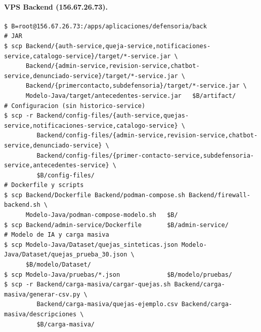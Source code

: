 \paragraph{VPS Backend (156.67.26.73).}
\begin{lstlisting}
$ B=root@156.67.26.73:/apps/aplicaciones/defensoria/back
# JAR
$ scp Backend/{auth-service,queja-service,notificaciones-service,catalogo-service}/target/*-service.jar \
      Backend/{admin-service,revision-service,chatbot-service,denunciado-service}/target/*-service.jar \
      Backend/{primercontacto,subdefensoria}/target/*-service.jar \
      Modelo-Java/target/antecedentes-service.jar   $B/artifact/
# Configuracion (sin historico-service)
$ scp -r Backend/config-files/{auth-service,quejas-service,notificaciones-service,catalogo-service} \
         Backend/config-files/{admin-service,revision-service,chatbot-service,denunciado-service} \
         Backend/config-files/{primer-contacto-service,subdefensoria-service,antecedentes-service} \
         $B/config-files/
# Dockerfile y scripts
$ scp Backend/Dockerfile Backend/podman-compose.sh Backend/firewall-backend.sh \
      Modelo-Java/podman-compose-modelo.sh   $B/
$ scp Backend/admin-service/Dockerfile       $B/admin-service/
# Modelo de IA y carga masiva
$ scp Modelo-Java/Dataset/quejas_sinteticas.json Modelo-Java/Dataset/quejas_prueba_30.json \
      $B/modelo/Dataset/
$ scp Modelo-Java/pruebas/*.json             $B/modelo/pruebas/
$ scp -r Backend/carga-masiva/cargar-quejas.sh Backend/carga-masiva/generar-csv.py \
         Backend/carga-masiva/quejas-ejemplo.csv Backend/carga-masiva/descripciones \
         $B/carga-masiva/
\end{lstlisting}

